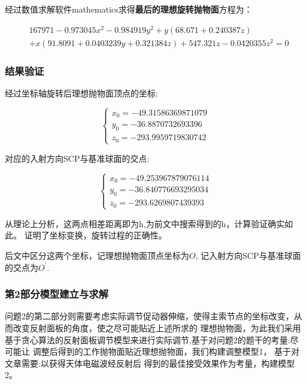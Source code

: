 \documentclass[withoutpreface,bwprint]{cumcmthesis} %
\begin{document}
经过数值求解软件mathematics求得\textbf{最后的理想旋转抛物面}方程为：

\begin{subequations}
    \begin{align}
        &167971 - 0.973045 x^2 - 0.984919 y^2 + y (68.671 + 0.240387 z) \\
        &+ x (91.8091 + 0.0403239 y + 0.321384 z)+ 547.321 z - 0.0420355 z^2 = 0
    \end{align}
\end{subequations}


\subsubsection{结果验证}

经过坐标轴旋转后理想抛物面顶点的坐标:

$$\begin{cases}
x_0 = -49.31586369871079 \\
y_0 = -36.8870732693396 \\
z_0 = -293.9959719830742
\end{cases}$$

对应的入射方向SCP与基准球面的交点:

$$\begin{cases}
x_0 = -49.253967879076114 \\
y_0 =  -36.840776693295034 \\
z_0 =  -293.6269807439393
\end{cases}$$

从理论上分析，这两点相差距离即为h,为前文中搜索得到的h，计算验证确实如此。
证明了坐标变换，旋转过程的正确性。


后文中区分这两个坐标，记理想抛物面顶点坐标为$O$,
记入射方向SCP与基准球面的交点为$O^\prime$.

\hspace*{\fill}

\hspace*{\fill}

\subsubsection{第2部分模型建立与求解}

问题2的第二部分则需要考虑实际调节促动器伸缩，使得主索节点的坐标改变，从而改变反射面板的角度，使之尽可能贴近上述所求的
理想抛物面，为此我们采用基于贪心算法的反射面板调节模型来进行实际调节,基于对问题2的题干的考量:尽可能让
调整后得到的工作抛物面贴近理想抛物面，我们构建调整模型1， 基于对文章需要:以获得天体电磁波经反射后
得到的最佳接受效果作为考量，构建模型2。
\end{document}
